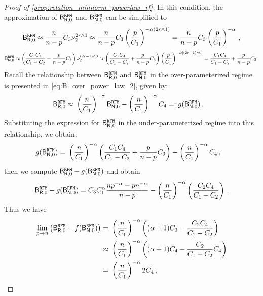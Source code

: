\begin{proof}[Proof of \cref{prop:relation_minnorm_powerlaw_rf}]
In this condition, the approximation of $\mathsf B_{\mathsf R,0}^{\tt RFM}$ and $\mathsf B_{\mathsf N,0}^{\tt RFM}$ can be simplified to 
\[
\begin{aligned}
\mathsf B_{\mathsf R,0}^{\tt RFM} 
\approx \frac{n}{n-p} C_3 \nu_2^{2r\wedge1} \approx \frac{n}{n-p} C_3 \left( \frac{p}{C_1} \right)^{-\alpha\left(2r\wedge1\right)} = \frac{n}{n-p} C_3 \left( \frac{p}{C_1} \right)^{-\alpha}\,,
\end{aligned}
\]
\[
\begin{aligned}
\mathsf B_{\mathsf N,0}^{\tt RFM} \approx \left(\frac{C_1C_4}{C_1-C_2}+\frac{p}{n-p}C_3\right) \nu_2^{(2r-1)\wedge0} \approx \left(\frac{C_1C_4}{C_1-C_2}+\frac{p}{n-p}C_3\right) \left(\frac{p}{C_1}\right)^{-\alpha\left[(2r-1)\wedge0\right]} = \frac{C_1C_4}{C_1-C_2}+\frac{p}{n-p}C_3\,.
\end{aligned}
\]
Recall the relationship between $\mathsf B_{\mathsf R,0}^{\tt RFM}$ and $\mathsf B_{\mathsf N,0}^{\tt RFM}$ in the over-parameterized regime is presented in \cref{eq:B_over_power_law_2}, given by: 
\[
\begin{aligned}
\mathsf B_{\mathsf R,0}^{\tt RFM} \approx&~ \left(\frac{n}{C_1}\right)^{-\alpha} \mathsf B_{\mathsf N,0}^{\tt RFM} - \left(\frac{n}{C_1}\right)^{-\alpha}C_4 =: g(\mathsf B_{\mathsf N,0}^{\tt RFM})\,.
\end{aligned}
\]
Substituting the expression for $\mathsf B_{\mathsf N,0}^{\tt RFM}$ in the under-parameterized regime into this relationship, we obtain:
\[
\begin{aligned}
g(\mathsf B_{\mathsf N,0}^{\tt RFM}) =&~ \left(\frac{n}{C_1}\right)^{-\alpha} \left(\frac{C_1C_4}{C_1-C_2}+\frac{p}{n-p}C_3\right) - \left(\frac{n}{C_1}\right)^{-\alpha}C_4\,,
\end{aligned}
\]
then we compute $\mathsf B_{\mathsf R,0}^{\tt RFM} - g(\mathsf B_{\mathsf N,0}^{\tt RFM})$ and obtain
\[
\begin{aligned}
    \mathsf B_{\mathsf R,0}^{\tt RFM} - g(\mathsf B_{\mathsf N,0}^{\tt RFM}) = C_3 C_1^{\alpha} \frac{np^{-\alpha} - pn^{-\alpha}}{n-p} - \left(\frac{n}{C_1}\right)^{-\alpha} \left( \frac{C_2C_4}{C_1-C_2} \right)\,.
\end{aligned}
\]
Thus we have
\[
\begin{aligned}
    \lim_{p \to n}\left( \mathsf B_{\mathsf R,0}^{\tt RFM} - f(\mathsf B_{\mathsf N,0}^{\tt RFM}) \right) =&~ \left(\frac{n}{C_1}\right)^{-\alpha} \left((\alpha+1)C_3 - \frac{C_2C_4}{C_1-C_2}\right)\\
    \approx&~ \left(\frac{n}{C_1}\right)^{-\alpha} \left((\alpha+1)C_4 - \frac{C_2}{C_1-C_2}C_4\right)\\
    =&~ \left(\frac{n}{C_1}\right)^{-\alpha} 2 C_4\,,
\end{aligned}
\]
\end{proof}
